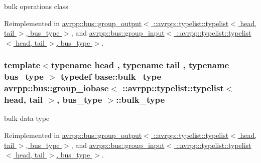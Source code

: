 bulk operations class 



Reimplemented in \hyperlink{structavrpp_1_1bus_1_1group__output_3_01_1_1avrpp_1_1typelist_1_1typelist_3_01head_00_01tail_01_4_00_01bus__type_01_4_ad2d880eba1fe7e186d50827f72aaefae}{avrpp::bus::group\_\-output$<$ ::avrpp::typelist::typelist$<$ head, tail $>$, bus\_\-type $>$}, and \hyperlink{structavrpp_1_1bus_1_1group__input_3_01_1_1avrpp_1_1typelist_1_1typelist_3_01head_00_01tail_01_4_00_01bus__type_01_4_a78526007dcd6a1d1e7e2a33d4ab36e6d}{avrpp::bus::group\_\-input$<$ ::avrpp::typelist::typelist$<$ head, tail $>$, bus\_\-type $>$}.

\hypertarget{structavrpp_1_1bus_1_1group__iobase_3_01_1_1avrpp_1_1typelist_1_1typelist_3_01head_00_01tail_01_4_00_01bus__type_01_4_ac5f551221d1d4e6bb1cb6b5ec9f564d5}{
\subsubsection[{bulk\_\-type}]{\setlength{\rightskip}{0pt plus 5cm}template$<$typename head , typename tail , typename bus\_\-type $>$ typedef base::bulk\_\-type avrpp::bus::group\_\-iobase$<$ ::{\bf avrpp::typelist::typelist}$<$ head, tail $>$, bus\_\-type $>$::{\bf bulk\_\-type}}}
\label{structavrpp_1_1bus_1_1group__iobase_3_01_1_1avrpp_1_1typelist_1_1typelist_3_01head_00_01tail_01_4_00_01bus__type_01_4_ac5f551221d1d4e6bb1cb6b5ec9f564d5}


bulk data type 



Reimplemented in \hyperlink{structavrpp_1_1bus_1_1group__output_3_01_1_1avrpp_1_1typelist_1_1typelist_3_01head_00_01tail_01_4_00_01bus__type_01_4_ac7b77056128a6aca8a53b79e95feaaed}{avrpp::bus::group\_\-output$<$ ::avrpp::typelist::typelist$<$ head, tail $>$, bus\_\-type $>$}, and \hyperlink{structavrpp_1_1bus_1_1group__input_3_01_1_1avrpp_1_1typelist_1_1typelist_3_01head_00_01tail_01_4_00_01bus__type_01_4_a65f2a153fc07f1aa2bc497f2c32800ef}{avrpp::bus::group\_\-input$<$ ::avrpp::typelist::typelist$<$ head, tail $>$, bus\_\-type $>$}.

